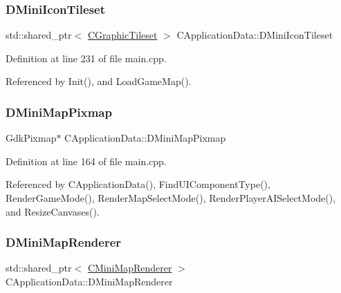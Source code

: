 \subsubsection{\texorpdfstring{D\+Mini\+Icon\+Tileset}{DMiniIconTileset}}
{\footnotesize\ttfamily std\+::shared\+\_\+ptr$<$ \hyperlink{classCGraphicTileset}{C\+Graphic\+Tileset} $>$ C\+Application\+Data\+::\+D\+Mini\+Icon\+Tileset\hspace{0.3cm}{\ttfamily [protected]}}



Definition at line 231 of file main.\+cpp.



Referenced by Init(), and Load\+Game\+Map().

\hypertarget{classCApplicationData_abe3af81659ead5113b7b2f165a88e737}{}\label{classCApplicationData_abe3af81659ead5113b7b2f165a88e737} 
\subsubsection{\texorpdfstring{D\+Mini\+Map\+Pixmap}{DMiniMapPixmap}}
{\footnotesize\ttfamily Gdk\+Pixmap$\ast$ C\+Application\+Data\+::\+D\+Mini\+Map\+Pixmap\hspace{0.3cm}{\ttfamily [protected]}}



Definition at line 164 of file main.\+cpp.



Referenced by C\+Application\+Data(), Find\+U\+I\+Component\+Type(), Render\+Game\+Mode(), Render\+Map\+Select\+Mode(), Render\+Player\+A\+I\+Select\+Mode(), and Resize\+Canvases().

\hypertarget{classCApplicationData_a59b0f5dfe30ed5a54dd28aee98109e34}{}\label{classCApplicationData_a59b0f5dfe30ed5a54dd28aee98109e34} 
\subsubsection{\texorpdfstring{D\+Mini\+Map\+Renderer}{DMiniMapRenderer}}
{\footnotesize\ttfamily std\+::shared\+\_\+ptr$<$ \hyperlink{classCMiniMapRenderer}{C\+Mini\+Map\+Renderer} $>$ C\+Application\+Data\+::\+D\+Mini\+Map\+Renderer\hspace{0.3cm}{\ttfamily [protected]}}



